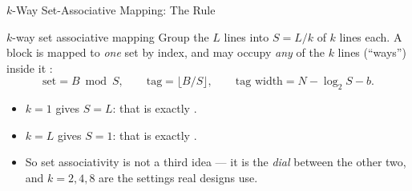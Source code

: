 \documentclass[aspectratio=169]{beamer}
\begin{document}
\begin{frame}{$k$-Way Set-Associative Mapping: The Rule}
  \begin{block}{$k$-way set associative mapping}
    Group the $L$ lines into $S = L/k$  of $k$ lines each. A block
    is mapped to \emph{one} set by index, and may occupy \emph{any} of the $k$
    lines (``ways'') inside it
    \cite[Fig.~5.13, PDF p.~200]{Stallings2015_computer_organization}:
    \[
      \text{set} = B \bmod S, \qquad
      \text{tag} = \lfloor B / S \rfloor, \qquad
      \text{tag width} = N - \log_2 S - b .
    \]
  \end{block}
  \begin{itemize}
    \item $k = 1$ gives $S = L$: that is exactly .
    \item $k = L$ gives $S = 1$: that is exactly .
    \item So set associativity is not a third idea --- it is the \emph{dial}
      between the other two, and $k = 2, 4, 8$ are the settings real designs
      use.
  \end{itemize}
\end{frame}
\end{document}
